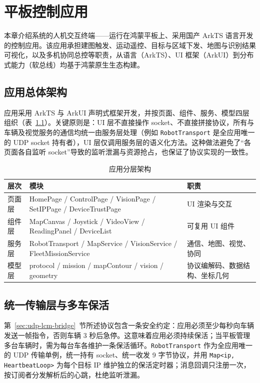 \chapter{平板控制应用}
\label{chap:tablet-app}

本章介绍系统的人机交互终端——运行在鸿蒙平板上、采用国产 ArkTS 语言开发的控制应用。该应用承担建图触发、运动遥控、目标与区域下发、地图与识别结果可视化，以及多机协同总控等职责，从语言（ArkTS）、UI 框架（ArkUI）到分布式能力（软总线）均基于鸿蒙原生生态构建。

\section{应用总体架构}
\label{sec:app-architecture}

应用采用 ArkTS 与 ArkUI 声明式框架开发，并按页面、组件、服务、模型四层组织（表~\ref{tab:app-layers}）。关键原则是：UI 层不直接操作 socket、不直接拼接协议，所有与车辆及视觉服务的通信均统一由服务层处理（例如 \texttt{RobotTransport} 是全应用唯一的 UDP socket 持有者），UI 层仅调用服务层的语义化方法。这种做法避免了“各页面各自监听 socket”导致的监听泄漏与资源抢占，也保证了协议实现的一致性。

\begin{table}[htbp]
\centering
\caption{应用分层架构}
\label{tab:app-layers}
\begin{tabularx}{\textwidth}{p{2cm}Xp{5cm}}
\toprule
\textbf{层次} & \textbf{模块} & \textbf{职责} \\
\midrule
页面层 & HomePage / ControlPage / VisionPage / SetIPPage / DeviceTrustPage & UI 渲染与交互 \\
组件层 & MapCanvas / Joystick / VideoView / ReadingPanel / DeviceList & 可复用 UI 组件 \\
服务层 & RobotTransport / MapService / VisionService / FleetMissionService & 通信、地图、视觉、协同 \\
模型层 & protocol / mission / mapContour / vision / geometry & 协议编解码、数据结构、坐标几何 \\
\bottomrule
\end{tabularx}
\end{table}

\section{统一传输层与多车保活}
\label{sec:robot-transport}

第~\ref{sec:udp-lcm-bridge}~节所述协议包含一条安全约定：应用必须至少每秒向车辆发送一帧指令，否则车辆 3 秒后急停。这意味着应用必须持续保活；当平板管理多台车辆时，需为每台车各维护一条保活循环。\texttt{RobotTransport} 作为全应用唯一的 UDP 传输单例，统一持有 socket、统一收发 9 字节协议，并用 \texttt{Map<ip, HeartbeatLoop>} 为每个目标 IP 维护独立的保活定时器；消息回调只注册一次，按订阅者分发解析后的心跳，杜绝监听泄漏。

